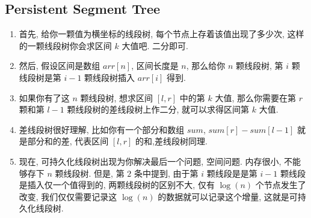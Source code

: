 \subsection{Persistent Segment Tree}
\begin{enumerate}
    \item 首先, 给你一颗值为横坐标的线段树, 每个节点上存着该值出现了多少次, 这样的一颗线段树你会求区间 $k$ 大值吧. 二分即可.
    \item 然后, 假设区间是数组 $arr[n]$, 区间长度是 $n$, 那么给你 $n$ 颗线段树, 第 $i$ 颗线段树是第 $i-1$ 颗线段树插入 $arr[i]$ 得到.
    \item 如果你有了这 $n$ 颗线段树, 想求区间 $[l,r]$ 中的第 $k$ 大值, 那么你需要在第 $r$ 颗和第 $l-1$ 颗线段树的差线段树上作二分, 就可以求得区间第 $k$ 大值.
    \item 差线段树很好理解, 比如你有一个部分和数组 $sum$, $sum[r]-sum[l-1]$ 就是部分和的差, 代表区间 $[l,r]$ 的和,差线段树同理.
    \item 现在, 可持久化线段树出现为你解决最后一个问题, 空间问题. 内存很小, 不能够存下 $n$ 颗线段树. 但是, 第 $2$ 条中提到, 由于第 $i$ 颗线段是是第 $i-1$ 颗线段是插入仅一个值得到的, 两颗线段树的区别不大, 仅有 $\log(n)$ 个节点发生了改变, 我们仅仅需要记录这 $\log(n)$ 的数据就可以记录这个增量, 这就是可持久化线段树.
\end{enumerate}
